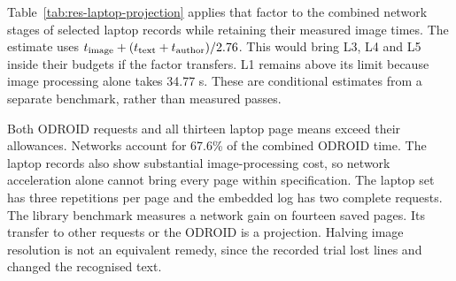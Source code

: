 Table~\ref{tab:res-laptop-projection} applies that factor to the combined network stages of selected laptop records while retaining their measured image times. The estimate uses $t_{\rm image}+(t_{\rm text}+t_{\rm author})/2.76$. This would bring L3, L4 and L5 inside their budgets if the factor transfers. L1 remains above its limit because image processing alone takes 34.77 s. These are conditional estimates from a separate benchmark, rather than measured passes.

Both ODROID requests and all thirteen laptop page means exceed their allowances. Networks account for 67.6\% of the combined ODROID time. The laptop records also show substantial image-processing cost, so network acceleration alone cannot bring every page within specification.
The laptop set has three repetitions per page and the embedded log has two complete requests. The library benchmark measures a network gain on fourteen saved pages. Its transfer to other requests or the ODROID is a projection. Halving image resolution is not an equivalent remedy, since the recorded trial lost lines and changed the recognised text.
\FloatBarrier

